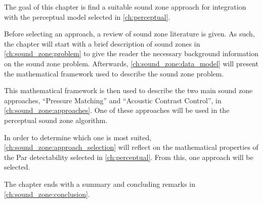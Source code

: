 The goal of this chapter is find a suitable sound zone approach for integration with the perceptual model selected in \autoref{ch:perceptual}.

Before selecting an approach, a review of sound zone literature is given.
As such, the chapter will start with a brief description of sound zones in \autoref{ch:sound_zone:problem} to give the reader 
the necessary background information on the sound zone problem.
Afterwards, \autoref{ch:sound_zone:data_model} will present the mathematical framework  
used to describe the sound zone problem.

This mathematical framework is then used to describe the two main sound zone approaches, ``Pressure Matching'' and ``Acoustic Contrast Control'', 
in \autoref{ch:sound_zone:approaches}.
One of these approaches will be used in the perceptual sound zone algorithm.

In order to determine which one is most suited, \autoref{ch:sound_zone:approach_selection} will reflect on the mathematical 
properties of the 
Par detectability selected in \autoref{ch:perceptual}.
From this, one approach will be selected.

The chapter ends with a summary and concluding remarks in \autoref{ch:sound_zone:conclusion}.
